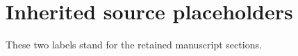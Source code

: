 \documentclass[11pt]{article}
\begin{document}
\section{Inherited source placeholders}
\label{subsec:v12-inputs}\label{sec:v13}
These two labels stand for the retained manuscript sections.

\end{document}
